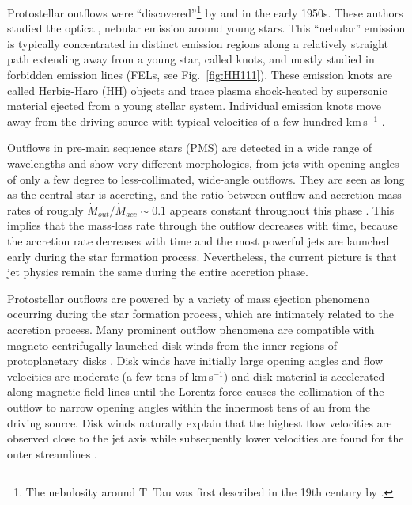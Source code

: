 \documentclass[graybox, nosecnum]{svmult}
\begin{document}
Protostellar outflows  were ``discovered''\footnote{The nebulosity around T~Tau was first described in the 19th century  by \citet{Burnham_1890, Burnham_1894}.} by \citet{Herbig_1950,Herbig_1951} and \citet{Haro_1952,Haro_1953} in the early 1950s. These authors studied the optical, nebular emission around young stars. This ``nebular'' emission is typically concentrated in distinct emission regions along a relatively straight path extending away from a young star, called knots, and mostly studied in forbidden emission lines (FELs, see Fig.~\ref{fig:HH111}). These emission knots are called Herbig-Haro (HH) objects and trace plasma shock-heated by supersonic material ejected from a young stellar system.
Individual emission knots move away from the driving source with typical velocities of a few hundred km\,s$^{-1}$ \cite{Eisloffel_1994}.

Outflows in pre-main sequence stars (PMS) are detected in a wide range of wavelengths and show very different morphologies, from jets with opening angles of only a few degree to less-collimated, wide-angle outflows. 
They are seen as long as the central star is accreting, and the ratio between outflow and accretion mass rates of roughly $\dot{M}_{out}/\dot{M}_{acc}\sim0.1$ appears constant throughout this phase \citep[e.g.,][]{Cabrit_2007, Nisini_2018}. This implies that the mass-loss rate through the outflow decreases with time, because the accretion rate decreases with time and the most powerful jets are launched early during the star formation process. Nevertheless, the current picture is that jet physics remain the same during the entire accretion phase.

Protostellar outflows are powered by a variety of mass ejection phenomena occurring during the star formation process, which are intimately related to the accretion process. 
Many prominent outflow phenomena are compatible with magneto-centrifugally launched disk winds \cite{Blandford_1982,Pudritz_1983} from the inner regions of protoplanetary disks \citep[roughly 0.1\,au to 10\,au, see][]{Frank_2014}. Disk winds have initially large opening angles and flow velocities are moderate (a few tens of km\,s$^{-1}$) and disk material is accelerated along magnetic field lines until the Lorentz force causes the collimation of the outflow to narrow opening angles within the innermost tens of au from the driving source. Disk winds naturally explain that the highest flow velocities are observed close to the jet axis while subsequently lower velocities are found for the outer streamlines \cite{Bacciotti_2000}.
\end{document}
